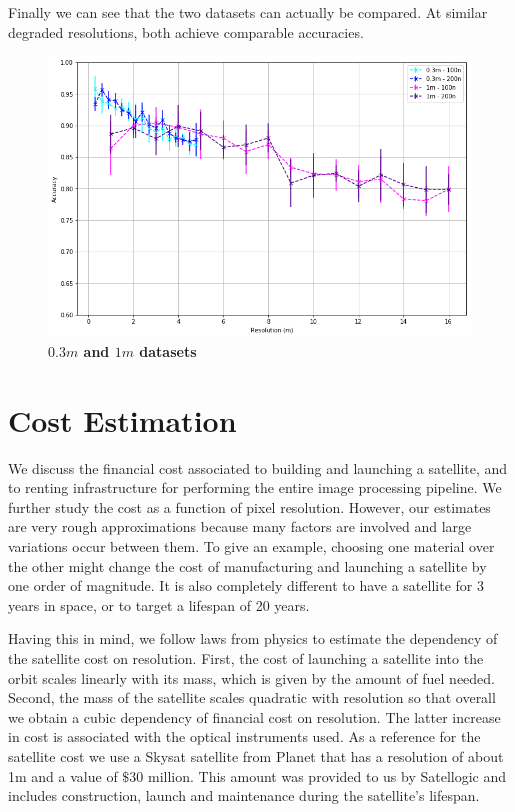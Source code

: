 Finally we can see that the two datasets can actually be compared. At similar degraded resolutions, both achieve comparable accuracies.

\begin{figure}[h!]
	\centering
	\includegraphics[width=\textwidth]{Figures/results/acc_res_03m_1m.png}
	\captionsetup{width=1\linewidth}
	\caption{\textbf{$0.3m$ and $1m$ datasets}}
	\label{fig:acc_res_03m_1m}
\end{figure}


\section{Cost Estimation}
We discuss the financial cost associated to building and launching a satellite, and to renting infrastructure for performing the entire image processing pipeline. We further study the cost as a function of pixel resolution. However, our estimates are very rough approximations because many factors are involved and large variations occur between them. To give an example, choosing one material over the other might change the cost of manufacturing and launching a satellite by one order of magnitude. It is also completely different to have a satellite for 3 years in space, or to target a lifespan of 20 years. 

Having this in mind, we follow laws from physics to estimate the dependency of the satellite cost on resolution. First, the cost of launching a satellite into the orbit scales linearly with its mass, which is given by the amount of fuel needed. Second, the mass of the satellite scales quadratic with resolution so that overall we obtain a cubic dependency of financial cost on resolution. The latter increase in cost is associated with the optical instruments used. As a reference for the satellite cost we use a Skysat satellite from Planet \parencite{skysat_planet} that has a resolution of about 1m and a value of $\$30$ million. This amount was provided to us by Satellogic and includes construction, launch and maintenance during the satellite's lifespan.

